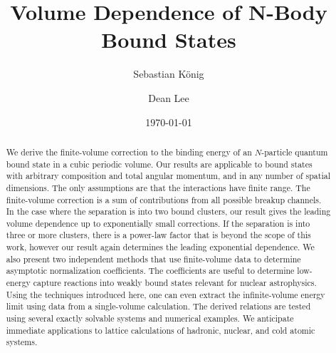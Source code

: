 \documentclass[aps,singlecolumn,superscriptaddress,nofootinbib,tightenlines,
preprintnumbers,showkeys]{revtex4-1}
\begin{document}
\title{Volume Dependence of ${\boldsymbol N}$-Body Bound States}


\author{Sebastian König}

\author{Dean Lee}

\date{\today}

\begin{abstract}
We derive the finite-volume correction to the binding energy of an
$N$-particle quantum bound state in a cubic periodic volume.  Our results are 
applicable to bound states with arbitrary composition and total angular 
momentum, and in any number of spatial dimensions.  The only assumptions are 
that the interactions have finite range.  The finite-volume correction is a sum 
of contributions from all possible breakup channels.  In the case where the 
separation is into two bound clusters, our result gives the leading volume 
dependence up to exponentially small corrections.  If the separation is into 
three or more clusters, there is a power-law factor that is beyond the scope of 
this work, however our result again determines the leading exponential 
dependence.  We also present two independent methods that use finite-volume data 
to determine asymptotic normalization coefficients.  The coefficients are useful 
to determine low-energy capture reactions into weakly bound states relevant for 
nuclear astrophysics.  Using the techniques introduced here, one can even 
extract the infinite-volume energy limit using data from a single-volume 
calculation.  The derived relations are tested using several exactly solvable 
systems and numerical examples.  We anticipate immediate applications to lattice 
calculations of hadronic, nuclear, and cold atomic systems.
\end{abstract}

\maketitle
\end{document}
